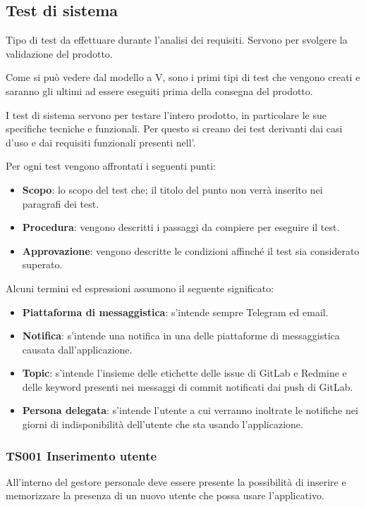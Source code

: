\subsection{Test di sistema}
Tipo di test da effettuare durante l'analisi dei requisiti. Servono per svolgere la validazione del prodotto.

Come si può vedere dal modello a V, sono i primi tipi di test che vengono creati e saranno gli ultimi ad essere eseguiti prima della consegna del prodotto.

I test di sistema servono per testare l'intero prodotto, in particolare le sue specifiche tecniche e funzionali. Per questo si creano dei test derivanti dai casi d'uso e dai requisiti funzionali presenti nell'\AdRd.

Per ogni test vengono affrontati i seguenti punti:

\begin{itemize}
	\item \textbf{Scopo}: lo scopo del test che; il titolo del punto non verrà inserito nei paragrafi dei test.
	\item \textbf{Procedura}: vengono descritti i passaggi da compiere per eseguire il test.
	\item \textbf{Approvazione}: vengono descritte le condizioni affinché il test sia considerato superato.
\end{itemize}

Alcuni termini ed espressioni assumono il seguente significato:

\begin{itemize}
	\item \textbf{Piattaforma di messaggistica}: s'intende sempre Telegram ed email.
	\item \textbf{Notifica}: s'intende una notifica in una delle piattaforme di messaggistica causata dall'applicazione.
	\item \textbf{Topic}: s'intende l'insieme delle etichette delle issue di GitLab e Redmine e delle keyword presenti nei messaggi di commit notificati dai push di GitLab.
	\item \textbf{Persona delegata}: s'intende l'utente a cui verranno inoltrate le notifiche nei giorni di indisponibilità dell'utente che sta usando l'applicazione. 
\end{itemize}

	\subsubsection{TS001 Inserimento utente}
		All'interno del gestore personale deve essere presente la possibilità di inserire e memorizzare la presenza di un nuovo utente che possa usare l'applicativo.
		

